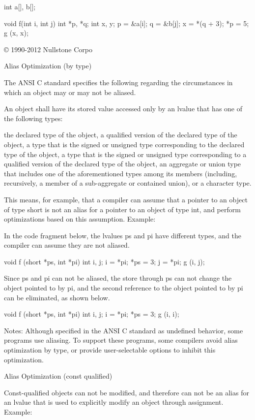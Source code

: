 {{{{{{{{{{    int a[], b[];

    void f(int i, int j)
    {
      int *p, *q;
      int x, y;
      p = &a[i];
      q = &b[j];
      x = *(q + 3);
      *p = 5;
      g (x, x);
    }

    © 1990-2012 Nullstone Corpo

    Alias Optimization (by type)

The ANSI C standard specifies the following regarding the circumstances in which an object may or may not be aliased.

An object shall have its stored value accessed only by an lvalue that has one of the following types:

    the declared type of the object,
    a qualified version of the declared type of the object,
    a type that is the signed or unsigned type corresponding to the declared type of the object,
    a type that is the signed or unsigned type corresponding to a qualified version of the declared type of the object,
    an aggregate or union type that includes one of the aforementioned types among its members (including, recursively, a member of a sub-aggregate or contained union), or
    a character type. 

This means, for example, that a compiler can assume that a pointer to an object of type short is not an alias for a pointer to an object of type int, and perform optimizations based on this assumption.
Example:

In the code fragment below, the lvalues ps and pi have different types, and the compiler can assume they are not aliased.

    void f (short *ps, int *pi)
    {
      int i, j;
      i = *pi;
      *ps = 3;
      j = *pi;
      g (i, j);
    }

Since ps and pi can not be aliased, the store through ps can not change the object pointed to by pi, and the second reference to the object pointed to by pi can be eliminated, as shown below.

    void f (short *ps, int *pi)
    {
      int i, j;
      i = *pi;
      *ps = 3;
      g (i, i);
    }

Notes:
Although specified in the ANSI C standard as undefined behavior, some programs use aliasing. To support these programs, some compilers avoid alias optimization by type, or provide user-selectable options to inhibit this optimization.

Alias Optimization (const qualified)

Const-qualified objects can not be modified, and therefore can not be an alias for an lvalue that is used to explicitly modify an object through assignment.
Example:

}}}}}}}}}}
